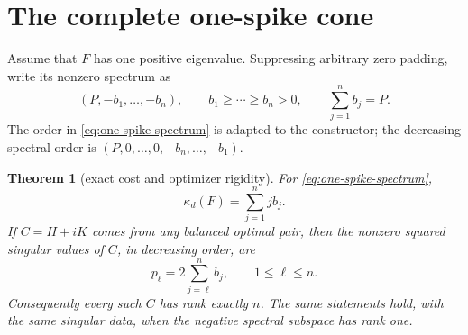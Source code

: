 \documentclass[11pt]{article}
\newtheorem{theorem}{Theorem}[section]
\theoremstyle{definition}
\theoremstyle{remark}
\newcommand{\1}{\mathbf 1}
\begin{document}
\section{The complete one-spike cone}

Assume that $F$ has one positive eigenvalue.  Suppressing arbitrary zero
padding, write its nonzero spectrum as
\begin{equation}
 (P,-b_1,\ldots,-b_n),
 \qquad b_1\ge\cdots\ge b_n>0,
 \qquad \sum_{j=1}^n b_j=P.
 \label{eq:one-spike-spectrum}
\end{equation}
The order in \eqref{eq:one-spike-spectrum} is adapted to the constructor; the
decreasing spectral order is $(P,0,\ldots,0,-b_n,\ldots,-b_1)$.

\begin{theorem}[exact cost and optimizer rigidity]
\label{thm:one-spike}
For \eqref{eq:one-spike-spectrum},
\begin{equation}
 \boxed{\quad \kappa_d(F)=\sum_{j=1}^n j b_j.\quad}
 \label{eq:one-spike-cost}
\end{equation}
If $C=H+iK$ comes from any balanced optimal pair, then the nonzero squared
singular values of $C$, in decreasing order, are
\begin{equation}
 p_\ell=2\sum_{j=\ell}^n b_j,
 \qquad 1\le\ell\le n.
 \label{eq:rigid-spectrum}
\end{equation}
Consequently every such $C$ has rank exactly $n$.  The same statements hold,
with the same singular data, when the negative spectral subspace has rank one.
\end{theorem}
\end{document}

